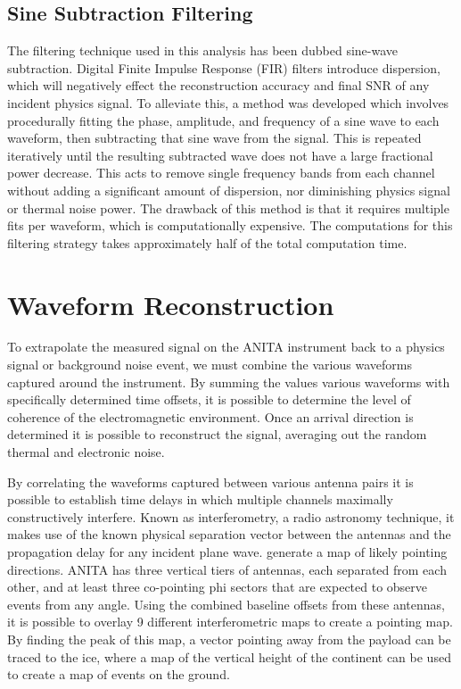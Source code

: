 	
	\subsection{Sine Subtraction Filtering}
		The filtering technique used in this analysis has been dubbed sine-wave subtraction.  Digital Finite Impulse Response (FIR) filters introduce dispersion, which will negatively effect the reconstruction accuracy and final SNR of any incident physics signal.  To alleviate this, a method was developed which involves procedurally fitting the phase, amplitude, and frequency of a sine wave to each waveform, then subtracting that sine wave from the signal.  This is repeated iteratively until the resulting subtracted wave does not have a large fractional power decrease.  This acts to remove single frequency bands from each channel without adding a significant amount of dispersion, nor diminishing physics signal or thermal noise power.  The drawback of this method is that it requires multiple fits per waveform, which is computationally expensive.  The computations for this filtering strategy takes approximately half of the total computation time.



\section{Waveform Reconstruction}
	To extrapolate the measured signal on the ANITA instrument back to a physics signal or background noise event, we must combine the various waveforms captured around the instrument.  By summing the values various waveforms with specifically determined time offsets, it is possible to determine the level of coherence of the electromagnetic environment.  Once an arrival direction is determined it is possible to reconstruct the signal, averaging out the random thermal and electronic noise.
	
	By correlating the waveforms captured between various antenna pairs it is possible to establish time delays in which multiple channels maximally constructively interfere.  Known as interferometry, a radio astronomy technique, it makes use of the known physical separation vector between the antennas and the propagation delay for any incident plane wave.  generate a map of likely pointing directions.  ANITA has three vertical tiers of antennas, each separated from each other, and at least three co-pointing phi sectors that are expected to observe events from any angle.  Using the combined baseline offsets from these antennas, it is possible to overlay 9 different interferometric maps to create a pointing map.  By finding the peak of this map, a vector pointing away from the payload can be traced to the ice, where a map of the vertical height of the continent can be used to create a map of events on the ground.
	
